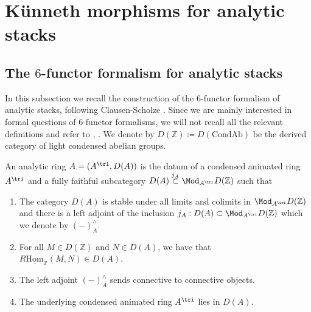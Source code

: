 \section{Künneth morphisms for analytic stacks}\label{$6$-functor formalism for analytic stacks}
\subsection{The $6$-functor formalism for analytic stacks}\label{6functorsforanalyticstacks}
In this subsection we recall the construction of the $6$-functor formalism of analytic stacks, following Clausen-Scholze \Cite[Lecture 16-20]{AnSt}. Since we are mainly interested in formal questions of $6$-functor formalisms, we will not recall all the relevant definitions and refer to \Cite{AnSt}, \Cite{clausen2022condensed}.   We denote by  $D(\mathbb{Z})\coloneqq D(\text{CondAb})$ be the derived category of light condensed abelian groups. 
\begin{definition}\label{defanring}\Cite[Lecture 8]{AnSt}
    An analytic ring $A=(A^{\tri},D(A))$ is the datum of a condensed animated ring $A^{\tri}$ and a fully faithful subcategory $D(A) \overset{j_A}{\subset} \Mod_{A^{\tri}}D(\mathbb{Z})$ such that
    \begin{enumerate}
       \item The category $D(A)$ is stable under all limits and colimits in $\Mod_{A^{\tri}}D(\mathbb{Z})$ and there is a left adjoint of the inclusion $j_A: D(A) \subset \Mod_{A^{\tri}}D(\mathbb{Z})$ which we denote by $(-)_A^\wedge$.
       \item For all $M \in D(\mathbb{Z})$ and $N \in D(A)$, we have that $R\underline{\text{Hom}}_{\mathbb{Z}}(M,N) \in D(A)$.
       \item The left adjoint $(-)_A^\wedge$ sends connective to connective objects.
       \item The underlying condensed animated ring $A^{\tri}$ lies in  $D(A)$.
    \end{enumerate}
\end{definition}

